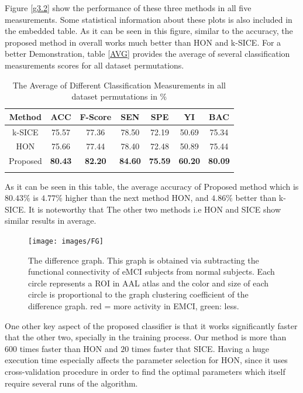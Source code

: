 \documentclass[journal]{IEEEtran}
\begin{document}
	
	Figure \eqref{g3.2} show the performance of these three methods in all five measurements. Some statistical information about these plots is also included in the embedded table. As it can be seen in this figure, similar to the accuracy, the proposed method in overall works much better than HON and k-SICE. For a better Demonstration, table \eqref{AVG} provides the average of several classification measurements scores for all dataset permutations. 
	\begin{table}
		\begin{center}
			\caption{The Average of Different Classification Measurements in all dataset permutations in \% }
			\begin{tabular}{@{}c*{6}{c}}
				\hline\hline
				Method&ACC& F-Score&SEN & SPE &YI & BAC 
				\\
				\hline
				k-SICE  &75.57& 77.36 & 78.50 & 72.19 & 50.69 & 75.34 
				\\
				HON   &75.66& 77.44 & 78.40 & 72.48 & 50.89 & 75.44  
				\\
				Proposed &\textbf{80.43}& \textbf{82.20} & \textbf{84.60} & \textbf{75.59} & \textbf{60.20} & \textbf{80.09}
				
				\\
				
				\hline\hline
				\label{AVG}
			\end{tabular}
		\end{center}
	\end{table}
	As it can be seen in this table, the average accuracy of Proposed method which is $80.43 \%$ is $4.77\%$ higher than the next method HON, and $4.86 \%$ better than k-SICE. It is noteworthy that The other two methods i.e HON and SICE show similar results in average.  
	
	\begin{figure}
		\centering
		\texttt{[image: images/FG]}
		\caption{
			The difference graph. This graph is obtained via subtracting the functional connectivity of eMCI subjects from normal subjects. Each circle represents a ROI in AAL atlas and the color and size of each circle is proportional to the graph clustering coefficient of the difference graph. red = more activity in EMCI, green: less. 
		}
		\label{g3.3}
	\end{figure}
	
	One other key aspect of the proposed classifier is that it works significantly faster that the other two, specially in the training process. Our method is more than $600$ times faster than HON and $20$ times faster that SICE. Having a huge execution time especially affects the parameter selection for HON, since it uses cross-validation procedure in order to find the optimal parameters which itself require several runs of the algorithm.   
	
\end{document}
